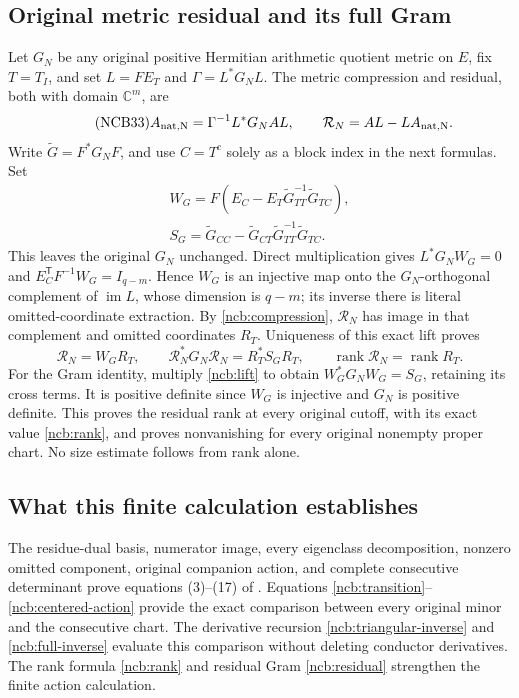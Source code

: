 \subsection{Original metric residual and its full Gram}
Let $G_N$ be any original positive Hermitian arithmetic quotient metric
on $E$, fix $T=T_I$, and set $L=FE_T$ and $\Gamma=L^*G_NL$.
The metric compression and residual, both with domain $\mathbb C^m$,
are
\begin{equation}\tag{NCB33}\label{ncb:compression}
A_{\rm nat,N}=\Gamma^{-1}L^*G_NAL,\qquad
\mathcal R_N=AL-LA_{\rm nat,N}.
\end{equation}
Write $\widetilde G=F^*G_NF$, and use $C=T^c$ solely as a block
index in the next formulas. Set
\begin{equation}\tag{NCB34}\label{ncb:lift}
\begin{gathered}
W_G=F(E_C-E_T\widetilde G_{TT}^{-1}\widetilde G_{TC}),\\
S_G=\widetilde G_{CC}
 -\widetilde G_{CT}\widetilde G_{TT}^{-1}\widetilde G_{TC}.
\end{gathered}
\end{equation}
This leaves the original $G_N$ unchanged. Direct multiplication gives
$L^*G_NW_G=0$ and $E_C^{\mathsf T}F^{-1}W_G=I_{q-m}$.
Hence $W_G$ is an injective map onto the $G_N$-orthogonal complement
of $\operatorname{im}L$, whose dimension is $q-m$; its inverse there
is literal omitted-coordinate extraction.
By \eqref{ncb:compression}, $\mathcal R_N$ has image in that
complement and omitted coordinates $R_T$. Uniqueness of this exact
lift proves
\begin{equation}\tag{NCB35}\label{ncb:residual}
\mathcal R_N=W_GR_T,\qquad
\mathcal R_N^*G_N\mathcal R_N=R_T^*S_GR_T,\qquad
\operatorname{rank}\mathcal R_N=\operatorname{rank}R_T .
\end{equation}
For the Gram identity, multiply \eqref{ncb:lift} to obtain
$W_G^*G_NW_G=S_G$, retaining its cross terms.
It is positive definite since $W_G$ is injective and $G_N$ is
positive definite. This proves the residual rank at every original
cutoff, with its exact value \eqref{ncb:rank}, and proves nonvanishing
for every original nonempty proper chart. No size estimate follows
from rank alone.

\subsection{What this finite calculation establishes}
The residue-dual basis, numerator image, every eigenclass
decomposition, nonzero omitted component, original companion action,
and complete consecutive determinant prove equations (3)--(17) of
\cite{prog:arrival02}. Equations
\eqref{ncb:transition}--\eqref{ncb:centered-action} provide the exact
comparison between every original minor and the consecutive chart.
The derivative recursion \eqref{ncb:triangular-inverse} and
\eqref{ncb:full-inverse} evaluate this comparison without deleting
conductor derivatives. The rank formula \eqref{ncb:rank} and residual
Gram \eqref{ncb:residual} strengthen the finite action calculation.

